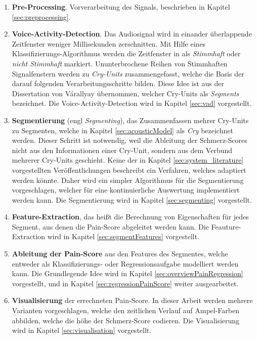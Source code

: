 \begin{enumerate}[leftmargin=*]
	\item \textbf{Pre-Processing}. Vorverarbeitung des Signals, beschrieben in Kapitel \ref{sec:preprocessing}.
	
	\item \textbf{Voice-Activity-Detection}. Das Audiosignal wird in einander überlappende Zeitfenster weniger Millisekunden zerschnitten. Mit Hilfe eines Klassifizierungs-Algorithmus werden die Zeitfenster in als \emph{Stimmhaft} oder \emph{nicht Stimmhaft} markiert. Ununterbrochene Reihen von Stimmhaften Signalfenstern werden zu \emph{Cry-Units} zusammengefasst, welche die Basis der darauf folgenden Verarbeitungsschritte bilden. Diese Idee ist aus der Dissertation von Várallyay \cite[S. 16 - 17]{cry_thesis} übernommen, welcher Cry-Units als \emph{Segments} bezeichnet. Die Voice-Activity-Detection wird in Kapitel \ref{sec:vad} vorgestellt.
	
	\item \textbf{Segmentierung} (engl \emph{Segmenting}), das Zusammenfassen mehrer Cry-Units zu Segmenten, welche in Kapitel \ref{sec:acousticModel} als \emph{Cry} bezeichnet werden. Dieser Schritt ist notwendig, weil die Ableitung der Schmerz-Scores nicht aus den Informationen einer Cry-Unit, sondern aus dem Verbund mehrerer Cry-Units geschieht. Keine der in Kapitel \ref{sec:system_literature} vorgestellten Veröffentlichungen beschreibt ein Verfahren, welches adaptiert werden könnte. Daher wird ein simpler Algorithmus für die Segmentierung vorgeschlagen, welcher für eine kontinuierliche Auswertung implementiert werden kann. Die Segmentierung wird in Kapitel \ref{sec:segmenting} vorgestellt.		
	
	\item \textbf{Feature-Extraction}, das heißt die Berechnung von Eigenschaften für jedes Segment, aus denen die Pain-Score abgeleitet werden kann. Die Feauture-Extraction wird in Kapitel \ref{sec:segmentFeatures} vorgestellt.	
	
	\item \textbf{Ableitung der Pain-Score} aus den Features des Segmentes, welche entweder als Klassifizierungs- oder Regressionsaufgabe modelliert werden kann. Die Grundlegende Idee wird in Kapitel \ref{sec:overviewPainRegression} vorgestellt, und in Kapitel \ref{sec:regressionPainScore} weiter ausgearbeitet.
	
	\item \textbf{Visualisierung} der errechneten Pain-Score. In dieser Arbeit werden mehrere Varianten vorgeschlagen, welche den zeitlichen Verlauf auf Ampel-Farben abbilden, welche die höhe der Schmerz-Score codieren. Die Visualisierung wird in Kapitel \ref{sec:visualisation}	vorgestellt.
\end{enumerate}

